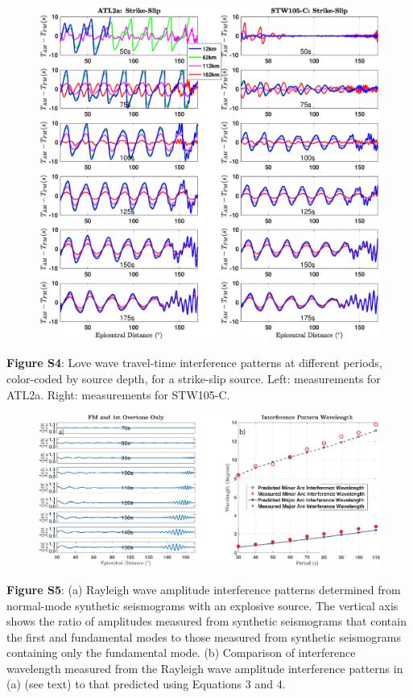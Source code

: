 \documentclass[extra,mreferee]{gji}
\begin{document}
\newpage
\begin{figure}
 \noindent\includegraphics[width=1\textwidth]{FigS4_VSver.eps}
\end{figure}
\textbf{Figure S4}: Love wave travel-time interference patterns at different periods, color-coded by source depth, for a strike-slip source. Left: measurements for ATL2a. Right: measurements for STW105-C.

\newpage
\begin{figure}
 \noindent\includegraphics[width=1\textwidth]{FigS5_VSver.eps}
\end{figure}
\textbf{Figure S5}: (a) Rayleigh wave amplitude interference patterns determined from normal-mode synthetic seismograms with an explosive source. The vertical axis shows the ratio of amplitudes measured from synthetic seismograms that contain the first and fundamental modes to those measured from synthetic seismograms containing only the fundamental mode. (b) Comparison of interference wavelength measured from the Rayleigh wave amplitude interference patterns in (a) (see text) to that predicted using Equations 3 and 4.
\end{document}
